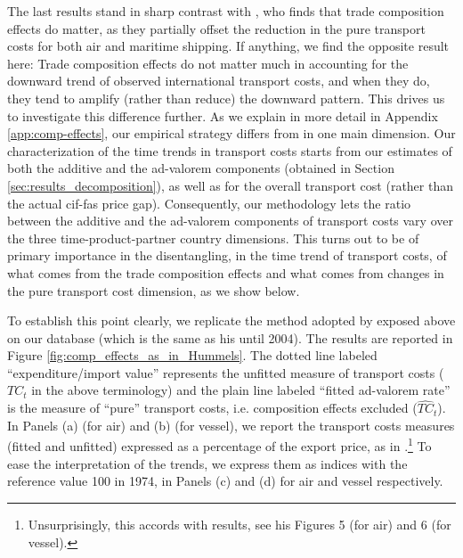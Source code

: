 \documentclass[a4paper,11pt]{article}
\begin{document}
The last results stand in sharp contrast with \cite{hummels2007}, who finds that trade composition effects do matter, as they partially offset the reduction in the pure transport costs for both air and maritime shipping.
If anything, we find the opposite result here: Trade composition effects do not matter much in accounting for the downward trend of observed international transport costs, and when they do, they tend to amplify (rather than reduce) the downward pattern.
This drives us to investigate this difference further.
As we explain in more detail in Appendix \ref{app:comp-effects}, our empirical strategy differs from \cite{hummels2007} in one main dimension.
Our characterization of the time trends in transport costs starts from our estimates of both the additive and the ad-valorem components (obtained in Section \ref{sec:results_decomposition}), as well as for the overall transport cost (rather than the actual cif-fas price gap).
Consequently, our methodology lets the ratio between the additive and the ad-valorem components of transport costs vary over the three time-product-partner country dimensions.
This turns out to be of primary importance in the disentangling, in the time trend of transport costs, of what comes from the trade composition effects and what comes from changes in the pure transport cost dimension, as we show below.

To establish this point clearly, we replicate the method adopted by \cite{hummels2007} exposed above on our database (which is the same as his until 2004).
The results are reported in Figure \ref{fig:comp_effects_as_in_Hummels}.
The dotted line labeled ``expenditure/import value'' represents the unfitted measure of transport costs ($TC_t$ in the above terminology) and the plain line labeled ``fitted ad-valorem rate'' is the measure of ``pure'' transport costs, i.e.
composition effects excluded ($\widehat{TC}_t$).
In Panels (a) (for air) and (b) (for vessel), we report the transport costs measures (fitted and unfitted) expressed as a percentage of the export price, as in \cite{hummels2007}.\footnote{Unsurprisingly, this accords with \cite{hummels2007} results, see his Figures 5 (for air) and 6 (for vessel).} To ease the interpretation of the trends, we express them as indices with the reference value 100 in 1974, in Panels (c) and (d) for air and vessel respectively.
\end{document}
